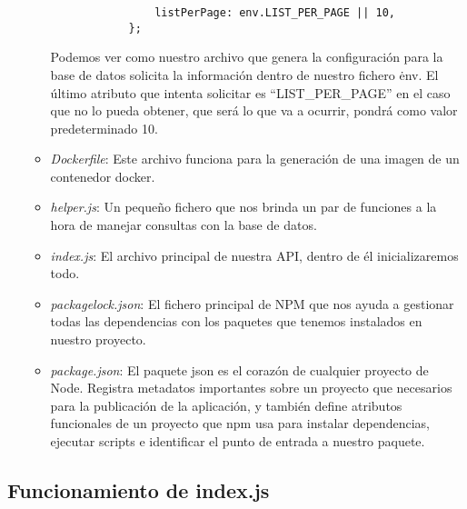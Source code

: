 \begin{itemize}
\begin{itemize}
\begin{verbatim}
                listPerPage: env.LIST_PER_PAGE || 10,
            };
        \end{verbatim}
                    \begin{tcolorbox}
                        [colback=green!5!white,colframe=green!75!black,fonttitle=\bfseries,title=Utilización del archivo .env]
                        Podemos ver como nuestro archivo que genera la configuración para la base de datos solicita la información dentro de nuestro fichero \.env. El último atributo que intenta solicitar es ``LIST\_PER\_PAGE'' en el caso que no lo pueda obtener, que será lo que va a ocurrir, pondrá como valor predeterminado 10.
                    \end{tcolorbox}
              \item \textit{Dockerfile}: Este archivo funciona para la generación de una imagen de un contenedor docker.
              \item \textit{helper.js}: Un pequeño fichero que nos brinda un par de funciones a la hora de manejar consultas con la base de datos.
              \item \textit{index.js}: El archivo principal de nuestra API, dentro de él inicializaremos todo.
              \item \textit{package\-lock.json}: El fichero principal de NPM que nos ayuda a gestionar todas las dependencias con los paquetes que tenemos instalados en nuestro proyecto.
              \item \textit{package.json}: El paquete json es el corazón de cualquier proyecto de Node. Registra metadatos importantes sobre un proyecto que necesarios para la publicación de la aplicación, y también define atributos funcionales de un proyecto que npm usa para instalar dependencias, ejecutar scripts e identificar el punto de entrada a nuestro paquete.
          \end{itemize}
\end{itemize}

\subsection{Funcionamiento de index.js}

